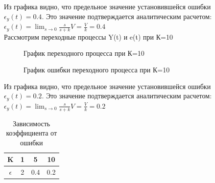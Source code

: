 \documentclass[a4paper, 11pt]{article}
\begin{document}
Из графика видно, что предельное значение установившейся ошибки $\epsilon_y(t)=0.4$. Это значение подтверждается аналитическим расчетом: $\epsilon_y(t)=\lim_{s\to0}\frac{s}{s+k}V=\frac{V}{k}=0.4$\\

Рассмотрим переходные процессы Y(t) и e(t) при К=10

\begin{figure}[h!]
    \caption{График переходного процесса при К=10}
    \label{two}
\end{figure}

\newpage

\begin{figure}[h!]
    \caption{График ошибки переходного процесса при К=10}
    \label{tree}
\end{figure}

Из графика видно, что предельное значение установившейся ошибки $\epsilon_y(t)=0.2$. Это значение подтверждается аналитическим расчетом: $\epsilon_y(t)=\lim_{s\to0}\frac{s}{s+k}V=\frac{V}{k}=0.2$\\

\begin{table}[h]
    \begin{center}
    \begin{tabular}{|c|c|c|c|}
    \hline
         K & 1 & 5 & 10 \\
         \hline
         $\epsilon$ & 2 & 0.4 & 0.2 \\
    \hline     
    \end{tabular}
    \caption{Зависимость коэффициента от ошибки}
    \label{tab:my_label}
    \end{center}
\end{table}
\end{document}
